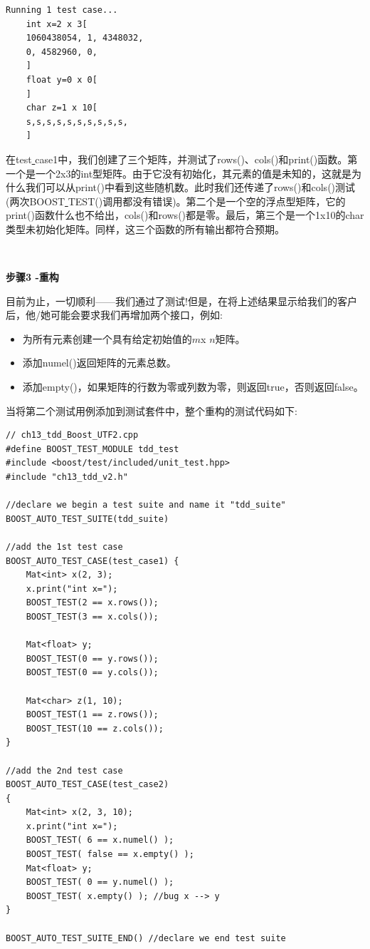 \begin{lstlisting}[caption={}]
Running 1 test case...
	int x=2 x 3[
	1060438054, 1, 4348032,
	0, 4582960, 0,
	]
	float y=0 x 0[
	]
	char z=1 x 10[
	s,s,s,s,s,s,s,s,s,s,
	]
\end{lstlisting}

在test\underline{ }case1中，我们创建了三个矩阵，并测试了rows()、cols()和print()函数。第一个是一个2x3的int型矩阵。由于它没有初始化，其元素的值是未知的，这就是为什么我们可以从print()中看到这些随机数。此时我们还传递了rows()和cols()测试(两次BOOST\underline{ }TEST()调用都没有错误)。第二个是一个空的浮点型矩阵，它的print()函数什么也不给出，cols()和rows()都是零。最后，第三个是一个1x10的char类型未初始化矩阵。同样，这三个函数的所有输出都符合预期。 \par

\noindent\textbf{}\ \par
\textbf{步骤3 -重构} \ \par
目前为止，一切顺利——我们通过了测试!但是，在将上述结果显示给我们的客户后，他/她可能会要求我们再增加两个接口，例如: \par

\begin{itemize}
	\item 为所有元素创建一个具有给定初始值的$ m $x $n $矩阵。
	\item 添加numel()返回矩阵的元素总数。
	\item 添加empty()，如果矩阵的行数为零或列数为零，则返回true，否则返回false。
\end{itemize}

当将第二个测试用例添加到测试套件中，整个重构的测试代码如下: \par

\begin{lstlisting}[caption={}]
// ch13_tdd_Boost_UTF2.cpp
#define BOOST_TEST_MODULE tdd_test
#include <boost/test/included/unit_test.hpp>
#include "ch13_tdd_v2.h"

//declare we begin a test suite and name it "tdd_suite"
BOOST_AUTO_TEST_SUITE(tdd_suite)

//add the 1st test case
BOOST_AUTO_TEST_CASE(test_case1) {
	Mat<int> x(2, 3);
	x.print("int x=");
	BOOST_TEST(2 == x.rows());
	BOOST_TEST(3 == x.cols());
	
	Mat<float> y;
	BOOST_TEST(0 == y.rows());
	BOOST_TEST(0 == y.cols());
	
	Mat<char> z(1, 10);
	BOOST_TEST(1 == z.rows());
	BOOST_TEST(10 == z.cols());
}

//add the 2nd test case
BOOST_AUTO_TEST_CASE(test_case2)
{
	Mat<int> x(2, 3, 10);
	x.print("int x=");
	BOOST_TEST( 6 == x.numel() );
	BOOST_TEST( false == x.empty() );
	Mat<float> y;
	BOOST_TEST( 0 == y.numel() );
	BOOST_TEST( x.empty() ); //bug x --> y
}

BOOST_AUTO_TEST_SUITE_END() //declare we end test suite
\end{lstlisting}

